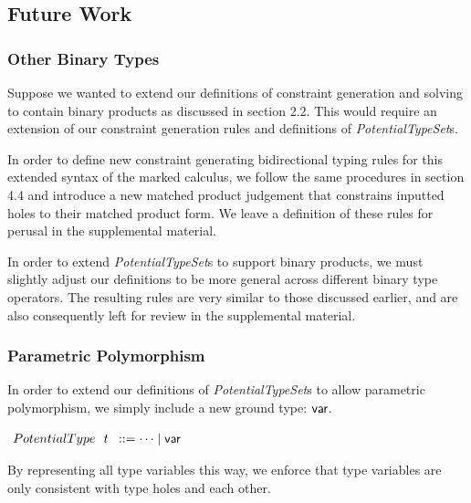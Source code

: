 \subsection{Future Work}
\subsubsection{Other Binary Types}
Suppose we wanted to extend our definitions of constraint generation and solving to contain binary products as discussed in section 2.2. This would require an extension of our constraint generation rules and definitions of \emph{PotentialTypeSet}s. 

In order to define new constraint generating bidirectional typing rules for this extended syntax of the marked calculus, we follow the same procedures in section 4.4 and introduce a new matched product judgement that constrains inputted holes to their matched product form. We leave a definition of these rules for perusal in the supplemental material.

In order to extend \emph{PotentialTypeSet}s to support binary products, we must slightly adjust our definitions to be more general across different binary type operators. The resulting rules are very similar to those discussed earlier, and are also consequently left for review in the supplemental material.

\subsubsection{Parametric Polymorphism}
In order to extend our definitions of \emph{PotentialTypeSet}s to allow parametric polymorphism, we simply include a new ground type: ${\normalfont\textsf{var}}$.
\begin{center}
$\arraycolsep=4pt\begin{array}{lll}
PotentialType~~ t & ::= 
  \dots \mid \TVar
\end{array}$
\end{center}
By representing all type variables this way, we enforce that type variables are only consistent with type holes and each other. 

